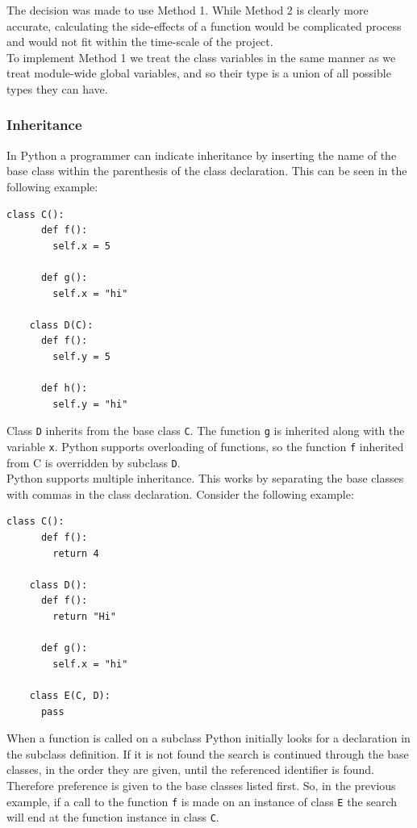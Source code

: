 \documentclass[12pt, titlepage]{article}
\begin{document}
The decision was made to use Method 1. While Method 2 is clearly more accurate, calculating the side-effects of a function would be complicated process and would not fit within the time-scale of the project. \\
\indent To implement Method 1 we treat the class variables in the same manner as we treat module-wide global variables, and so their type is a union of all possible types they can have.


\subsubsection{Inheritance}
In Python a programmer can indicate inheritance by inserting the name of the base class within the parenthesis of the class declaration. This can be seen in the following example:
\begin{lstlisting}[mathescape]
	class C():
	  def f():
	    self.x = 5
		
	  def g():
	    self.x = "hi"

	class D(C):
	  def f():
	    self.y = 5
		
	  def h():
	    self.y = "hi"
\end{lstlisting}
Class \texttt{D} inherits from the base class \texttt{C}. The function \texttt{g} is inherited along with the variable \texttt{x}. Python supports overloading of functions, so the function \texttt{f} inherited from C is overridden by subclass \texttt{D}. \\
\indent Python supports multiple inheritance. This works by separating the base classes with commas in the class declaration. Consider the following example: 
\begin{lstlisting}[mathescape]
	class C():
	  def f():
	    return 4
	    
	class D():
	  def f():
	    return "Hi"
	    
	  def g():
	    self.x = "hi"

	class E(C, D):
	  pass
\end{lstlisting}
When a function is called on a subclass Python initially looks for a declaration in the subclass definition. If it is not found the search is continued through the base classes, in the order they are given, until the referenced identifier is found. Therefore preference is given to the base classes listed first. So, in the previous example, if a call to the function \texttt{f} is made on an instance of class \texttt{E} the search will end at the function instance in class \texttt{C}. \\
\end{document}
